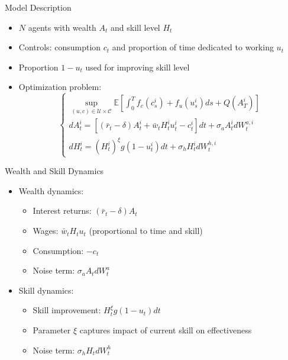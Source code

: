 \documentclass{beamer}
\begin{document}
\begin{frame}{Model Description}
\begin{itemize}
    \item $N$ agents with wealth $A_t$ and skill level $H_t$
    \item Controls: consumption $c_t$ and proportion of time dedicated to working $u_t$
    \item Proportion $1-u_t$ used for improving skill level
    \item Optimization problem:
    \begin{equation}
    \begin{cases}
        \sup\limits_{(u,c) \in \mathcal{U} \times \mathcal{C}}\mathbb{E} [ \int_0^T f_c(c^i_s) + f_u(u^i_s) ds + Q(A^i_T) ]\\
        d A^i_t = \left[ (\bar r_t - \delta) A^i_t + \bar w_t H^i_t u^i_t - c^i_t  \right] dt + \sigma_a A^i_t d W^{a,i}_t\\
        d H^i_t = (H^i_t)^\xi g(1 - u^i_t) dt + \sigma_h H^i_t d W^{h,i}_t
    \end{cases}
    \end{equation}
\end{itemize}
\end{frame}

\begin{frame}{Wealth and Skill Dynamics}
\begin{itemize}
    \item Wealth dynamics:
    \begin{itemize}
        \item Interest returns: $(\bar r_t - \delta) A_t$
        \item Wages: $\bar w_t H_t u_t$ (proportional to time and skill)
        \item Consumption: $-c_t$
        \item Noise term: $\sigma_a A_t d W^a_t$
    \end{itemize}
    \item Skill dynamics:
    \begin{itemize}
        \item Skill improvement: $H^\xi_t g(1 - u_t) dt$
        \item Parameter $\xi$ captures impact of current skill on effectiveness
        \item Noise term: $\sigma_h H_t dW^h_t$
    \end{itemize}
\end{itemize}
\end{frame}
\end{document}
